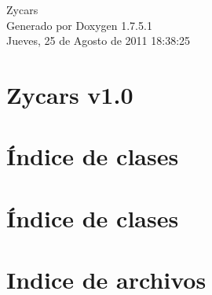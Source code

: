 \documentclass[a4paper]{book}
\begin{document}
\hypersetup{pageanchor=false,citecolor=blue}
\begin{titlepage}
\vspace*{7cm}
\begin{center}
{\Large \-Zycars }\\
\vspace*{1cm}
{\large \-Generado por Doxygen 1.7.5.1}\\
\vspace*{0.5cm}
{\small Jueves, 25 de Agosto de 2011 18:38:25}\\
\end{center}
\end{titlepage}
\clearemptydoublepage
{}
\tableofcontents
\clearemptydoublepage
{}
\hypersetup{pageanchor=true,citecolor=blue}
\chapter{\-Zycars v1.0}
\label{index}\hypertarget{index}{}
\chapter{Índice de clases}

\chapter{Índice de clases}

\chapter{\-Indice de archivos}

\end{document}
